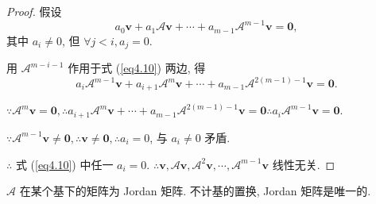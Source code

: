 \documentclass{ctexart}
\begin{document}
\begin{proof}
    假设
    \begin{equation}\label{eq4.10}
        a_0\boldsymbol{v}+a_1\mathcal{A}\boldsymbol{v}+\cdots+a_{m-1}\mathcal{A}^{m-1}\boldsymbol{v}=\boldsymbol{0},
    \end{equation}
    其中 $a_i\neq0$, 但 $\forall j<i,a_j=0$.

    用 $\mathcal{A}^{m-i-1}$ 作用于式 (\ref{eq4.10}) 两边, 得
    \[a_i\mathcal{A}^{m-1}\boldsymbol{v}+a_{i+1}\mathcal{A}^m\boldsymbol{v}+\cdots+a_{m-1}\mathcal{A}^{2(m-1)-1}\boldsymbol{v}=\boldsymbol{0}.\]

    $\because\mathcal{A}^m\boldsymbol{v}=\boldsymbol{0},\therefore a_{i+1}\mathcal{A}^m\boldsymbol{v}+\cdots+a_{m-1}\mathcal{A}^{2(m-1)-1}\boldsymbol{v}=\boldsymbol{0}\therefore a_i\mathcal{A}^{m-1}\boldsymbol{v}=\boldsymbol{0}$.

    $\because\mathcal{A}^{m-1}\boldsymbol{v}\neq\boldsymbol{0},\therefore\boldsymbol{v}\neq\boldsymbol{0},\therefore a_i=0$, 与 $a_i\neq0$ 矛盾.
    
    $\therefore$ 式 (\ref{eq4.10}) 中任一 $a_i=0$. $\therefore\boldsymbol{v},\mathcal{A}\boldsymbol{v},\mathcal{A}^2\boldsymbol{v},\cdots,\mathcal{A}^{m-1}\boldsymbol{v}$ 线性无关.
\end{proof}
\begin{theorem}\label{t4.4}
    $\mathcal{A}$ 在某个基下的矩阵为 Jordan 矩阵. 不计基的置换, Jordan 矩阵是唯一的.
\end{theorem}
\end{document}

